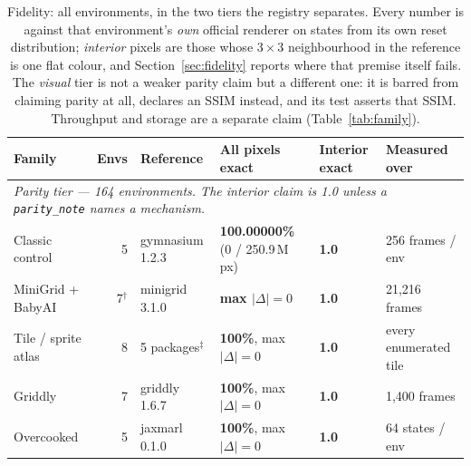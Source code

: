 \documentclass{article}
\begin{document}
\begin{table}[t]
\centering
\caption{Fidelity: all \seNenvs{} environments, in the two tiers the registry
separates. Every number is against that environment's \emph{own} official
renderer on states from its own reset distribution; \emph{interior} pixels are
those whose $3\times3$ neighbourhood in the reference is one flat colour, and
Section~\ref{sec:fidelity} reports where that premise itself fails. The
\emph{visual} tier is not a weaker parity claim but a different one: it is
barred from claiming parity at all, declares an SSIM instead, and its test
asserts that SSIM. Throughput and storage are a separate claim
(Table~\ref{tab:family}).}
\label{tab:coverage}
\vskip 0.06in
\scriptsize
\setlength{\tabcolsep}{4pt}
\renewcommand{\arraystretch}{0.94}
\begin{tabular}{lrllll}
\toprule
Family & Envs & Reference & All pixels exact & Interior exact & Measured over \\
\midrule
\multicolumn{6}{l}{\emph{Parity tier --- 164 environments. The interior claim is 1.0 unless a \texttt{parity\_note} names a mechanism.}}\\
\midrule
Classic control      & 5  & gymnasium 1.2.3          & \textbf{100.00000\%} (0 / 250.9\,M px) & \textbf{1.0} & 256 frames / env \\
MiniGrid + BabyAI    & 7$^{\dagger}$ & minigrid 3.1.0 & \textbf{max $|\Delta| = 0$} & \textbf{1.0} & 21,216 frames \\
Tile / sprite atlas  & 8  & 5 packages$^{\ddagger}$   & \textbf{100\%}, max $|\Delta| = 0$ & \textbf{1.0} & every enumerated tile \\
Griddly              & 7  & griddly 1.6.7            & \textbf{100\%}, max $|\Delta| = 0$ & \textbf{1.0} & 1,400 frames \\
Overcooked           & 5  & jaxmarl 0.1.0            & \textbf{100\%}, max $|\Delta| = 0$ & \textbf{1.0} & 64 states / env \\

\end{tabular}
\end{table}
\end{document}
